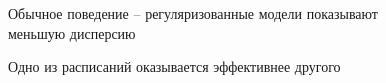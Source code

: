 \documentclass[12pt, twoside]{article}
\begin{document}
\begin{figure}[h!]
\caption{Обычное поведение -- регуляризованные модели показывают меньшую дисперсию }
\end{figure}
\begin{figure}[h!]
\caption{Одно из расписаний оказывается эффективнее другого}
\end{figure}

\newpage
\end{document}
